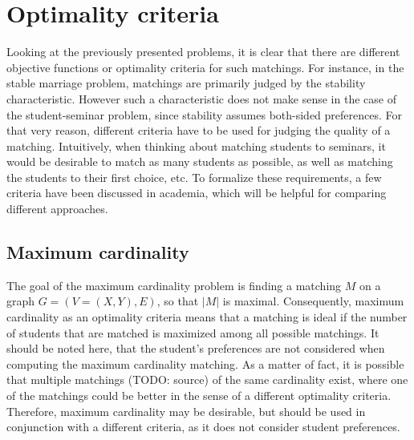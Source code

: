 \section{Optimality criteria}
Looking at the previously presented problems, it is clear that there are different objective functions or optimality criteria for such matchings. For instance, in the stable marriage problem, matchings are primarily judged by the stability characteristic. However such a characteristic does not make sense in the case of the student-seminar problem, since stability assumes both-sided preferences. For that very reason, different criteria have to be used for judging the quality of a matching.
\newline
Intuitively, when thinking about matching students to seminars, it would be desirable to match as many students as possible, as well as matching the students to their first choice, etc. To formalize these requirements, a few criteria have been discussed in academia, which will be helpful for comparing different approaches. 

\subsection{Maximum cardinality}
The goal of the maximum cardinality problem is finding a matching $M$ on a graph $G=(V=(X, Y), E)$, so that $|M|$ is maximal.\cite{GraphTheoryIntro} Consequently, maximum cardinality as an optimality criteria means that a matching is ideal if the number of students that are matched is maximized among all possible matchings. It should be noted here, that the student's preferences are not considered when computing the maximum cardinality matching. As a matter of fact, it is possible that multiple matchings (TODO: source) of the same cardinality exist, where one of the matchings could be better in the sense of a different optimality criteria. Therefore, maximum cardinality may be desirable, but should be used in conjunction with a different criteria, as it does not consider student preferences.

